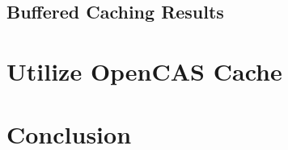 \documentclass{article}
\begin{document}
\subsection{Buffered Caching Results}


\section{Utilize OpenCAS Cache}

\section{Conclusion}

\newpage
\printbibliography
\end{document}
